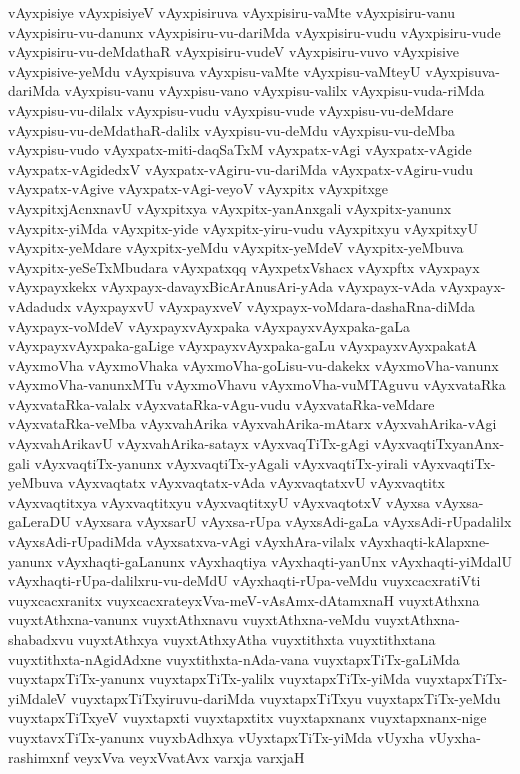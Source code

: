 {vAyxpisiye
vAyxpisiyeV
vAyxpisiruva
vAyxpisiru-vaMte
vAyxpisiru-vanu
vAyxpisiru-vu-danunx
vAyxpisiru-vu-dariMda
vAyxpisiru-vudu
vAyxpisiru-vude
vAyxpisiru-vu-deMdathaR
vAyxpisiru-vudeV
vAyxpisiru-vuvo
vAyxpisive
vAyxpisive-yeMdu
vAyxpisuva
vAyxpisu-vaMte
vAyxpisu-vaMteyU
vAyxpisuva-dariMda
vAyxpisu-vanu
vAyxpisu-vano
vAyxpisu-valilx
vAyxpisu-vuda-riMda
vAyxpisu-vu-dilalx
vAyxpisu-vudu
vAyxpisu-vude
vAyxpisu-vu-deMdare
vAyxpisu-vu-deMdathaR-dalilx
vAyxpisu-vu-deMdu
vAyxpisu-vu-deMba
vAyxpisu-vudo
vAyxpatx-miti-daqSaTxM
vAyxpatx-vAgi
vAyxpatx-vAgide
vAyxpatx-vAgidedxV
vAyxpatx-vAgiru-vu-dariMda
vAyxpatx-vAgiru-vudu
vAyxpatx-vAgive
vAyxpatx-vAgi-veyoV
vAyxpitx
vAyxpitxge
vAyxpitxjAcnxnavU
vAyxpitxya
vAyxpitx-yanAnxgali
vAyxpitx-yanunx
vAyxpitx-yiMda
vAyxpitx-yide
vAyxpitx-yiru-vudu
vAyxpitxyu
vAyxpitxyU
vAyxpitx-yeMdare
vAyxpitx-yeMdu
vAyxpitx-yeMdeV
vAyxpitx-yeMbuva
vAyxpitx-yeSeTxMbudara
vAyxpatxqq
vAyxpetxVshacx
vAyxpftx
vAyxpayx
vAyxpayxkekx
vAyxpayx-davayxBicArAnusAri-yAda
vAyxpayx-vAda
vAyxpayx-vAdadudx
vAyxpayxvU
vAyxpayxveV
vAyxpayx-voMdara-dashaRna-diMda
vAyxpayx-voMdeV
vAyxpayxvAyxpaka
vAyxpayxvAyxpaka-gaLa
vAyxpayxvAyxpaka-gaLige
vAyxpayxvAyxpaka-gaLu
vAyxpayxvAyxpakatA
vAyxmoVha
vAyxmoVhaka
vAyxmoVha-goLisu-vu-dakekx
vAyxmoVha-vanunx
vAyxmoVha-vanunxMTu
vAyxmoVhavu
vAyxmoVha-vuMTAguvu
vAyxvataRka
vAyxvataRka-valalx
vAyxvataRka-vAgu-vudu
vAyxvataRka-veMdare
vAyxvataRka-veMba
vAyxvahArika
vAyxvahArika-mAtarx
vAyxvahArika-vAgi
vAyxvahArikavU
vAyxvahArika-satayx
vAyxvaqTiTx-gAgi
vAyxvaqtiTxyanAnx-gali
vAyxvaqtiTx-yanunx
vAyxvaqtiTx-yAgali
vAyxvaqtiTx-yirali
vAyxvaqtiTx-yeMbuva
vAyxvaqtatx
vAyxvaqtatx-vAda
vAyxvaqtatxvU
vAyxvaqtitx
vAyxvaqtitxya
vAyxvaqtitxyu
vAyxvaqtitxyU
vAyxvaqtotxV
vAyxsa
vAyxsa-gaLeraDU
vAyxsara
vAyxsarU
vAyxsa-rUpa
vAyxsAdi-gaLa
vAyxsAdi-rUpadalilx
vAyxsAdi-rUpadiMda
vAyxsatxva-vAgi
vAyxhAra-vilalx
vAyxhaqti-kAlapxne-yanunx
vAyxhaqti-gaLanunx
vAyxhaqtiya
vAyxhaqti-yanUnx
vAyxhaqti-yiMdalU
vAyxhaqti-rUpa-dalilxru-vu-deMdU
vAyxhaqti-rUpa-veMdu
vuyxcacxratiVti
vuyxcacxranitx
vuyxcacxrateyxVva-meV-vAsAmx-dAtamxnaH
vuyxtAthxna
vuyxtAthxna-vanunx
vuyxtAthxnavu
vuyxtAthxna-veMdu
vuyxtAthxna-shabadxvu
vuyxtAthxya
vuyxtAthxyAtha
vuyxtithxta
vuyxtithxtana
vuyxtithxta-nAgidAdxne
vuyxtithxta-nAda-vana
vuyxtapxTiTx-gaLiMda
vuyxtapxTiTx-yanunx
vuyxtapxTiTx-yalilx
vuyxtapxTiTx-yiMda
vuyxtapxTiTx-yiMdaleV
vuyxtapxTiTxyiruvu-dariMda
vuyxtapxTiTxyu
vuyxtapxTiTx-yeMdu
vuyxtapxTiTxyeV
vuyxtapxti
vuyxtapxtitx
vuyxtapxnanx
vuyxtapxnanx-nige
vuyxtavxTiTx-yanunx
vuyxbAdhxya
vUyxtapxTiTx-yiMda
vUyxha
vUyxha-rashimxnf
veyxVva
veyxVvatAvx
varxja
varxjaH
}

